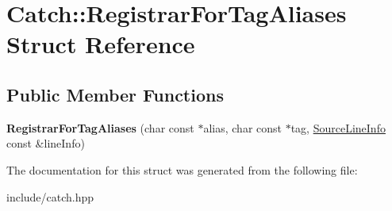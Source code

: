 \hypertarget{structCatch_1_1RegistrarForTagAliases}{}\section{Catch\+:\+:Registrar\+For\+Tag\+Aliases Struct Reference}
\label{structCatch_1_1RegistrarForTagAliases}
\subsection*{Public Member Functions}
\begin{DoxyCompactItemize}
\item 
{\bfseries Registrar\+For\+Tag\+Aliases} (char const $\ast$alias, char const $\ast$tag, \hyperlink{structCatch_1_1SourceLineInfo}{Source\+Line\+Info} const \&line\+Info)\hypertarget{structCatch_1_1RegistrarForTagAliases_ae4e45830e4763bcd65d55d8db9167b69}{}\label{structCatch_1_1RegistrarForTagAliases_ae4e45830e4763bcd65d55d8db9167b69}

\end{DoxyCompactItemize}


The documentation for this struct was generated from the following file\+:\begin{DoxyCompactItemize}
\item 
include/catch.\+hpp\end{DoxyCompactItemize}
